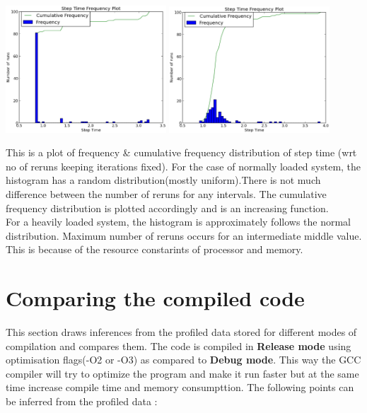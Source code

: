 \documentclass[11pt, a4paper]{article}
\begin{document}
\begin{center}
\includegraphics[width = 6cm]{plots-normal/l6.eps}
\includegraphics[width = 6cm]{plots-high/h6.eps}
\end{center}
This is a plot of frequency \& cumulative frequency distribution of step time (wrt no of reruns keeping iterations fixed). For the case of normally loaded system, the histogram has a random distribution(mostly uniform).There is not much difference between the number of	reruns for any intervals. The cumulative frequency distribution is plotted accordingly and is an increasing function.\\
For a heavily loaded system, the histogram is approximately follows the normal distribution. Maximum number of reruns occurs for an intermediate middle value. This is because of the resource constarints of processor and memory.




\section{Comparing the compiled code} 
This section draws inferences from the profiled data stored for different modes of compilation and compares them.
The code is compiled in \textbf{Release mode} using optimisation flags(-O2 or -O3) as compared to \textbf{Debug mode}. This way the GCC compiler will try to optimize the program and make it run faster but at the same time increase compile time and memory consumpttion. The following points can be inferred from the profiled data : 
\end{document}
